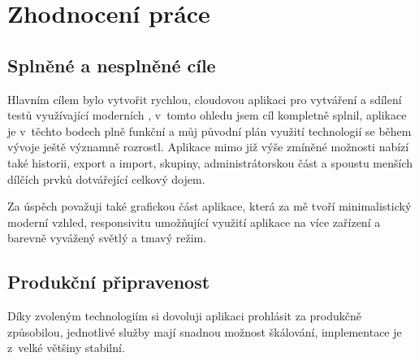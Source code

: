 \documentclass[12pt, a4paper,
openright
]{report}
\let\oldchapter\chapter
\renewcommand{\chapter}{
	\clearpage
	\pagestyle{fancy}
	\oldchapter
}
\begin{document}

\chapter{Zhodnocení práce}

\section{Splněné a nesplněné cíle}
Hlavním cílem bylo vytvořit rychlou, cloudovou aplikaci pro vytváření a sdílení testů využívající moderních , v~tomto ohledu jsem cíl kompletně splnil, aplikace je v~těchto bodech plně funkční a můj původní plán využití technologií se během vývoje ještě významně rozrostl. Aplikace mimo již výše zmíněné možnosti nabízí také historii, export a import, skupiny, administrátorskou část a spoustu menších dílčích prvků dotvářející celkový dojem.

Za úspěch považuji také grafickou část aplikace, která za mě tvoří minimalistický moderní vzhled, responsivitu umožňující využití aplikace na více zařízení a barevně vyvážený světlý a tmavý režim.

\section{Produkční připravenost}
Díky zvoleným technologiím si dovoluji aplikaci prohlásit za produkčně způsobilou, jednotlivé služby mají snadnou možnost škálování, implementace je z~velké většiny stabilní.
\end{document}

